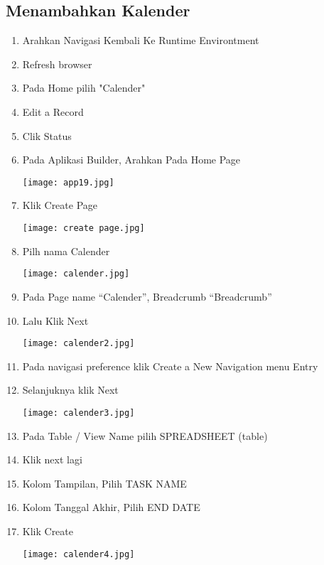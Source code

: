 \documentclass[a4paper,12pt]{report}
\begin{document}
\subsection{Menambahkan Kalender}
\begin{enumerate}
    \item Arahkan Navigasi Kembali Ke Runtime Environtment
    \item Refresh browser
    \item Pada Home pilih "Calender"
    \item Edit a Record
    \item Clik Status
    \item Pada Aplikasi Builder, Arahkan Pada Home Page
    \begin{center}
    \texttt{[image: app19.jpg]}
    \end{center}
    \item Klik Create Page
     \begin{center}
    \texttt{[image: create page.jpg]}
    \end{center}
    \item Pilh nama  Calender
     \begin{center}
    \texttt{[image: calender.jpg]}
    \end{center}
    \item Pada Page name “Calender”, Breadcrumb “Breadcrumb”
    \item Lalu Klik Next
     \begin{center}
    \texttt{[image: calender2.jpg]}
    \end{center}
    \item Pada navigasi preference klik Create a New Navigation menu Entry
    \item Selanjuknya klik Next
     \begin{center}
    \texttt{[image: calender3.jpg]}
    \end{center}
    \item Pada Table / View Name pilih SPREADSHEET (table)
    \item Klik next lagi 
    \item Kolom Tampilan, Pilih TASK NAME
    \item Kolom Tanggal Akhir, Pilih END DATE	
    \item Klik Create
      \begin{center}
    \texttt{[image: calender4.jpg]}
    \end{center}
\end{enumerate}
\end{document}
